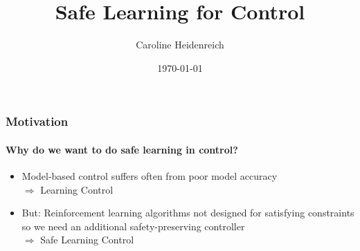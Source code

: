 \documentclass[t]{beamer}
\title[Inisintiur sequi aliquia tis dis in para] 
{%
  Safe Learning for Control%
}
\author[Oskar, Friends]
{
Caroline Heidenreich
}
\institute{}
\date{\today}
\begin{document}
\begin{frame}
\titlepage
\end{frame}

\begin{frame}
\frametitle{Motivation}
\framesubtitle{Why do we want to do safe learning in control?}
\begin{itemize}
\item Model-based control suffers often from poor model accuracy\\
$\Rightarrow$ Learning Control
\item But: Reinforcement learning algorithms not designed for satisfying constraints so we need an additional safety-preserving controller\\ $\Rightarrow$ Safe Learning Control
\end{itemize}

\end{frame}
\end{document}
